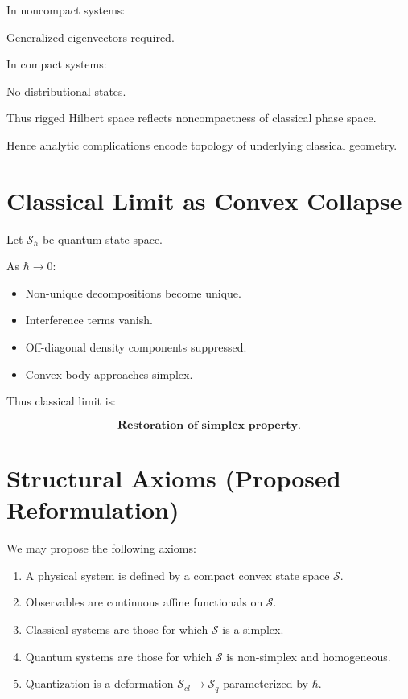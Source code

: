 \documentclass[11pt]{book}
\begin{document}
In noncompact systems:

Generalized eigenvectors required.

In compact systems:

No distributional states.

Thus rigged Hilbert space reflects noncompactness of classical phase space.

Hence analytic complications encode topology of underlying classical geometry.

\section{Classical Limit as Convex Collapse}

Let $\mathcal{S}_\hbar$ be quantum state space.

As $\hbar \to 0$:

\begin{itemize}
\item Non-unique decompositions become unique.
\item Interference terms vanish.
\item Off-diagonal density components suppressed.
\item Convex body approaches simplex.
\end{itemize}

Thus classical limit is:

\[
\textbf{Restoration of simplex property}.
\]

\section{Structural Axioms (Proposed Reformulation)}

We may propose the following axioms:

\begin{enumerate}
\item A physical system is defined by a compact convex state space $\mathcal{S}$.
\item Observables are continuous affine functionals on $\mathcal{S}$.
\item Classical systems are those for which $\mathcal{S}$ is a simplex.
\item Quantum systems are those for which $\mathcal{S}$ is non-simplex and homogeneous.
\item Quantization is a deformation $\mathcal{S}_{cl} \to \mathcal{S}_q$ parameterized by $\hbar$.
\end{enumerate}
\end{document}
